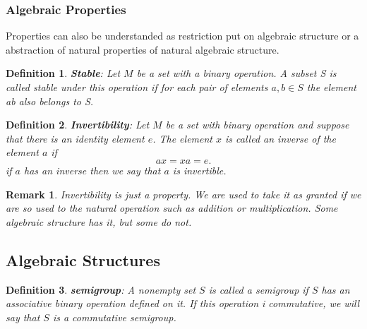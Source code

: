 \documentclass[a4paper]{book}
\newtheorem{definition}{Definition}[section]
\newtheorem{remark}{Remark}[section]
\begin{document}
      \subsubsection{Algebraic Properties}

      Properties can also be understanded as restriction put on algebraic
      structure or a abstraction of natural properties of natural algebraic
      structure.

      \begin{definition}
        \textbf{Stable}: Let $M$ be a set with a binary operation. A subset S
        is called stable under this operation if for each pair of elements
        $a,b \in S$ the element ab also belongs to S.\cite{dixon2011algebra}
      \end{definition}

      \begin{definition}
        \textbf{Invertibility}: Let $M$ be a set with binary operation and
        suppose that there is an identity element $e$. The element $x$ is
        called an inverse of the element $a$ if 
        \begin{displaymath}
          ax = xa = e.
        \end{displaymath}
        if $a$ has an inverse then we say that $a$ is invertible.\cite{dixon2011algebra}
      \end{definition}

      \begin{remark}
        Invertibility is just a property. We are used to take it as granted if we
        are so used to the natural operation such as addition or
        multiplication. Some algebraic structure has it, but some do not.
      \end{remark}

    \subsection{Algebraic Structures}

    \begin{definition}
      \textbf{semigroup}: A nonempty set $S$ is called a semigroup if $S$
      has an associative binary operation defined on it. If this operation i
      commutative, we will say that $S$ is a commutative semigroup.\cite{dixon2011algebra}
    \end{definition}
\end{document}
